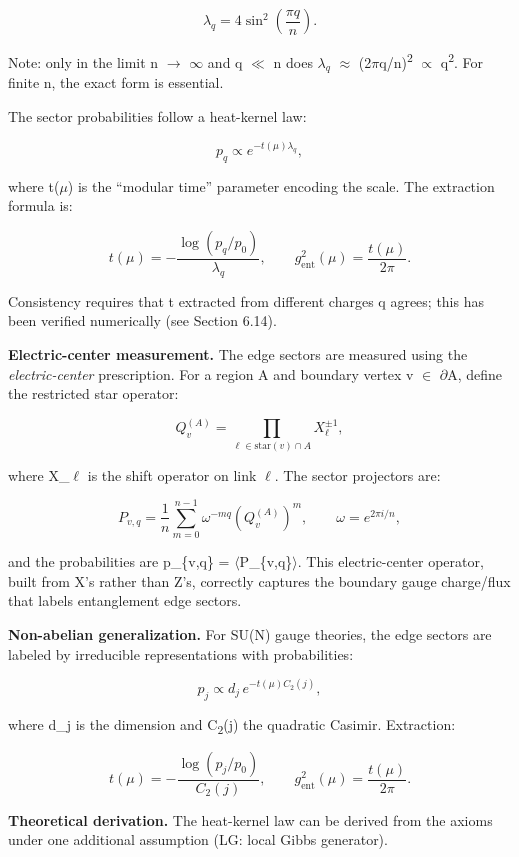 \documentclass[11pt,a4paper]{article}
\theoremstyle{remark}
\begin{document}
\[
\lambda_q = 4 \sin^2\left(\frac{\pi q}{n}\right).
\]

Note: only in the limit n \ensuremath{\to} \ensuremath{\infty} and q \ensuremath{\ll} n does \(\lambda_q\) \ensuremath{\approx}
(2\ensuremath{\pi}q/n)\textsuperscript{2} \ensuremath{\propto} q\textsuperscript{2}. For finite n, the exact form is essential.

The sector probabilities follow a heat-kernel law:

\[
p_q \propto e^{-t(\mu) \lambda_q},
\]

where t(\ensuremath{\mu}) is the ``modular time'' parameter encoding the scale. The
extraction formula is:

\[
t(\mu) = -\frac{\log(p_q/p_0)}{\lambda_q}, \qquad
g_{\mathrm{ent}}^2(\mu) = \frac{t(\mu)}{2\pi}.
\]

Consistency requires that t extracted from different charges q agrees;
this has been verified numerically (see Section 6.14).

\textbf{Electric-center measurement.} The edge sectors are measured using the
\emph{electric-center} prescription. For a region A and boundary vertex
v \ensuremath{\in} \ensuremath{\partial}A, define the restricted star operator:

\[
Q_v^{(A)} = \prod_{\ell \in \mathrm{star}(v) \cap A} X_\ell^{\pm 1},
\]

where X\_\ensuremath{\ell} is the shift operator on link \ensuremath{\ell}. The sector projectors are:

\[
P_{v,q} = \frac{1}{n} \sum_{m=0}^{n-1} \omega^{-mq} \left(Q_v^{(A)}\right)^m,
\qquad \omega = e^{2\pi i/n},
\]

and the probabilities are p\_\{v,q\} = \ensuremath{\langle}P\_\{v,q\}\ensuremath{\rangle}. This
electric-center operator, built from X's rather than Z's, correctly
captures the boundary gauge charge/flux that labels entanglement edge sectors.

\textbf{Non-abelian generalization.} For SU(N) gauge theories, the edge
sectors are labeled by irreducible representations with probabilities:

\[
p_j \propto d_j \, e^{-t(\mu) C_2(j)},
\]

where d\_j is the dimension and C\textsubscript{2}(j) the quadratic Casimir. Extraction:

\[
t(\mu) = -\frac{\log(p_j/p_0)}{C_2(j)}, \qquad
g_{\mathrm{ent}}^2(\mu) = \frac{t(\mu)}{2\pi}.
\]

\textbf{Theoretical derivation.} The heat-kernel law can be derived from the axioms
under one additional assumption (LG: local Gibbs generator).
\end{document}
